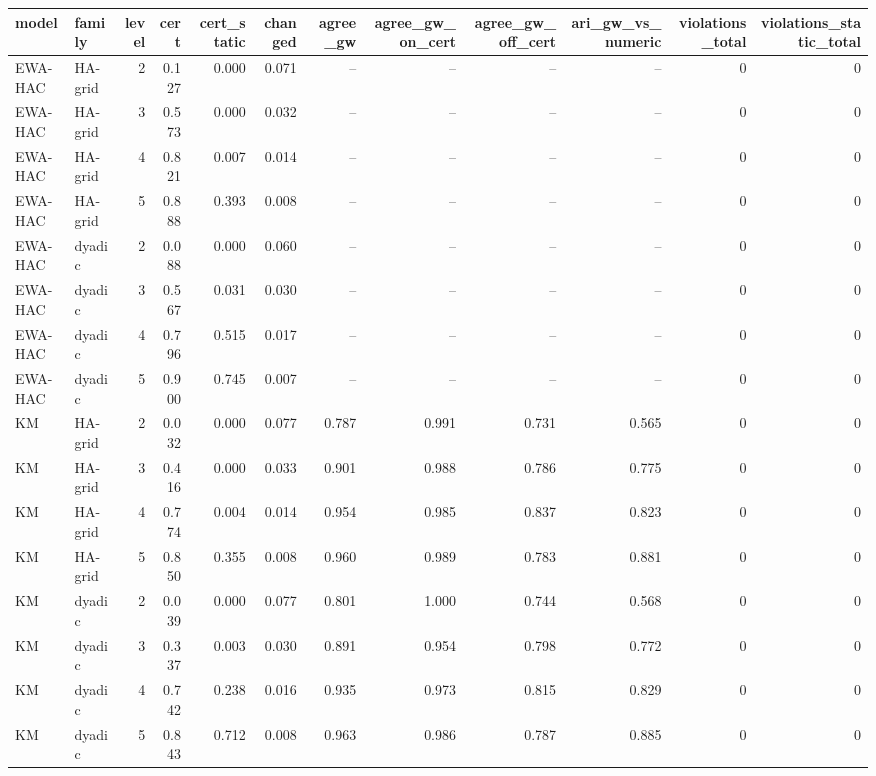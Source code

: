 \begin{tabular}{llrrrrrrrrrr}
\toprule
model & family & level & cert & cert_static & changed & agree_gw & agree_gw_on_cert & agree_gw_off_cert & ari_gw_vs_numeric & violations_total & violations_static_total \\
\midrule
EWA-HAC & HA-grid & 2 & 0.127 & 0.000 & 0.071 & -- & -- & -- & -- & 0 & 0 \\
EWA-HAC & HA-grid & 3 & 0.573 & 0.000 & 0.032 & -- & -- & -- & -- & 0 & 0 \\
EWA-HAC & HA-grid & 4 & 0.821 & 0.007 & 0.014 & -- & -- & -- & -- & 0 & 0 \\
EWA-HAC & HA-grid & 5 & 0.888 & 0.393 & 0.008 & -- & -- & -- & -- & 0 & 0 \\
EWA-HAC & dyadic & 2 & 0.088 & 0.000 & 0.060 & -- & -- & -- & -- & 0 & 0 \\
EWA-HAC & dyadic & 3 & 0.567 & 0.031 & 0.030 & -- & -- & -- & -- & 0 & 0 \\
EWA-HAC & dyadic & 4 & 0.796 & 0.515 & 0.017 & -- & -- & -- & -- & 0 & 0 \\
EWA-HAC & dyadic & 5 & 0.900 & 0.745 & 0.007 & -- & -- & -- & -- & 0 & 0 \\
KM & HA-grid & 2 & 0.032 & 0.000 & 0.077 & 0.787 & 0.991 & 0.731 & 0.565 & 0 & 0 \\
KM & HA-grid & 3 & 0.416 & 0.000 & 0.033 & 0.901 & 0.988 & 0.786 & 0.775 & 0 & 0 \\
KM & HA-grid & 4 & 0.774 & 0.004 & 0.014 & 0.954 & 0.985 & 0.837 & 0.823 & 0 & 0 \\
KM & HA-grid & 5 & 0.850 & 0.355 & 0.008 & 0.960 & 0.989 & 0.783 & 0.881 & 0 & 0 \\
KM & dyadic & 2 & 0.039 & 0.000 & 0.077 & 0.801 & 1.000 & 0.744 & 0.568 & 0 & 0 \\
KM & dyadic & 3 & 0.337 & 0.003 & 0.030 & 0.891 & 0.954 & 0.798 & 0.772 & 0 & 0 \\
KM & dyadic & 4 & 0.742 & 0.238 & 0.016 & 0.935 & 0.973 & 0.815 & 0.829 & 0 & 0 \\
KM & dyadic & 5 & 0.843 & 0.712 & 0.008 & 0.963 & 0.986 & 0.787 & 0.885 & 0 & 0 \\
\bottomrule
\end{tabular}
